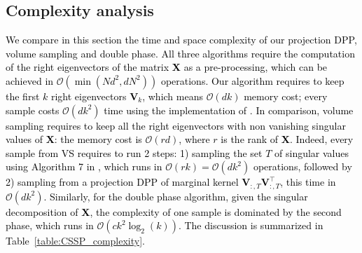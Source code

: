 \documentclass[twoside,11pt]{book}
\newcommand{\rev}[1]{\textcolor{black}{#1}}
\numberwithin{theorem}{chapter}
\numberwithin{definition}{chapter}
\numberwithin{proposition}{chapter}
\numberwithin{corollary}{chapter}
\numberwithin{example}{chapter}
\numberwithin{lemma}{chapter}
\numberwithin{assumption}{chapter}
\numberwithin{equation}{chapter}
\numberwithin{figure}{chapter}
\DeclareMathOperator{\Tran}{\intercal}
\begin{document}
\subsection{Complexity analysis}\label{sec:complexity}
\rev{We compare in this section the time and space complexity of our projection DPP, volume sampling and double phase.
All three algorithms require the computation of the right eigenvectors of the matrix $\bm{X}$ as a pre-processing, which can be achieved in $\mathcal{O}(\min(N d^{2},dN^{2}))$ operations.
Our algorithm requires to keep the first $k$ right eigenvectors $\bm{V}_{k}$, which means $\mathcal{O}(dk)$ memory cost; every sample costs $\mathcal{O}(dk^{2})$ time using the implementation of \cite{TrBaAm18}.}
\rev{In comparison, volume sampling requires to keep all the right eigenvectors with non vanishing singular values of $\bm{X}$: the memory cost is $\mathcal{O}(r d)$, where $r$ is the rank of $\bm{X}$.
Indeed, every sample from VS requires to run 2 steps: 1) sampling the set $T$ of singular values using Algorithm 7 in \citep{KuTa12}, which runs in $\mathcal{O}(rk) = \mathcal{O}(dk^{2})$ operations, followed by 2) sampling from a projection DPP of marginal kernel $\bm{V}_{:,T}^{\phantom{\Tran}}\bm{V}_{:,T}^{\Tran}$, this time in $\mathcal{O}(dk^{2})$.
%
Similarly, for the double phase algorithm, given the singular decomposition of $\bm{X}$, the complexity of one sample is dominated by the second phase, which runs in $\mathcal{O}(c k^{2} \log_{2}(k))$. The discussion is summarized in Table~\ref{table:CSSP_complexity}.}
\end{document}
